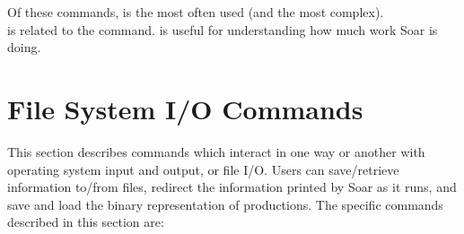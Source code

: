 Of these commands,  is the most often used (and the most complex). \\
 is related to the  command.  is useful for understanding how much work Soar is doing.

\subdivider


\divider


\divider


\divider


\divider


\divider


\divider



\section{File System I/O Commands}
\label{INTERFACE-file-io}

This section describes commands which interact in one way or another with operating system input and output, or file I/O.  Users can save/retrieve information to/from files, redirect the information printed by Soar as it runs, and save and load the binary representation of productions. The specific commands described in this section are:

